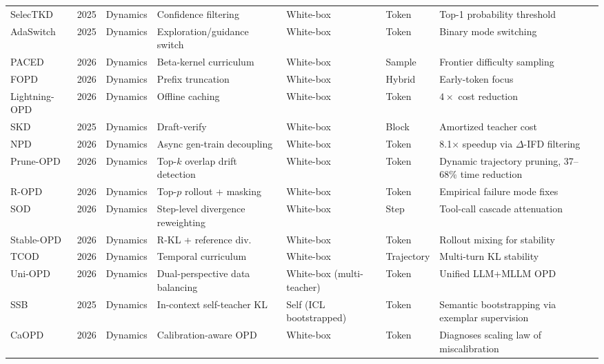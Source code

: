 \documentclass{article} %
\begin{document}
\begin{table}[t]
{\begin{tabular}{@{}lclllll@{}}
        SelecTKD \citep{2510.24021} & 2025 & Dynamics & Confidence filtering & White-box & Token & Top-1 probability threshold \\
        AdaSwitch \citep{2510.07842} & 2025 & Dynamics & Exploration/guidance switch & White-box & Token & Binary mode switching \\
        PACED \citep{2603.11178} & 2026 & Dynamics & Beta-kernel curriculum & White-box & Sample & Frontier difficulty sampling \\
        FOPD \citep{2602.15260} & 2026 & Dynamics & Prefix truncation & White-box & Hybrid & Early-token focus \\
        Lightning-OPD \citep{wu2026lightning} & 2026 & Dynamics & Offline caching & White-box & Token & $4\times$ cost reduction \\
        SKD \citep{2410.11325} & 2025 & Dynamics & Draft-verify & White-box & Block & Amortized teacher cost \\
        NPD \citep{rang2026npd} & 2026 & Dynamics & Async gen-train decoupling & White-box & Token & 8.1$\times$ speedup via $\Delta$-IFD filtering \\
        Prune-OPD \citep{yang2026pruneopd} & 2026 & Dynamics & Top-$k$ overlap drift detection & White-box & Token & Dynamic trajectory pruning, 37--68\% time reduction \\
        R-OPD \citep{2603.25562} & 2026 & Dynamics & Top-$p$ rollout + masking & White-box & Token & Empirical failure mode fixes \\
        SOD \citep{zhong2026sod} & 2026 & Dynamics & Step-level divergence reweighting & White-box & Step & Tool-call cascade attenuation \\
        Stable-OPD \citep{luo2026demystifying} & 2026 & Dynamics & R-KL + reference div. & White-box & Token & Rollout mixing for stability \\
        TCOD \citep{chen2026tcod} & 2026 & Dynamics & Temporal curriculum & White-box & Trajectory & Multi-turn KL stability \\
        Uni-OPD \citep{hou2026uniopd} & 2026 & Dynamics & Dual-perspective data balancing & White-box (multi-teacher) & Token & Unified LLM+MLLM OPD \\
        SSB \citep{mitra2025semantic} & 2025 & Dynamics & In-context self-teacher KL & Self (ICL bootstrapped) & Token & Semantic bootstrapping via exemplar supervision \\
        CaOPD \citep{2604.16830} & 2026 & Dynamics & Calibration-aware OPD & White-box & Token & Diagnoses scaling law of miscalibration \\

\end{tabular}}
\end{table}
\end{document}
